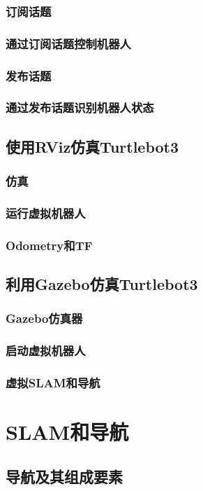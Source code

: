 \documentclass[geye,green,kindle,cn]{elegantnote}
\begin{document}
\subsubsection{订阅话题}
\subsubsection{通过订阅话题控制机器人}
\subsubsection{发布话题}
\subsubsection{通过发布话题识别机器人状态}
\subsection{使用RViz仿真Turtlebot3}
\subsubsection{仿真}
\subsubsection{运行虚拟机器人}
\subsubsection{Odometry和TF}
\subsection{利用Gazebo仿真Turtlebot3}
\subsubsection{Gazebo仿真器}
\subsubsection{启动虚拟机器人}
\subsubsection{虚拟SLAM和导航}
\section{SLAM和导航}
\subsection{导航及其组成要素}
\end{document}
